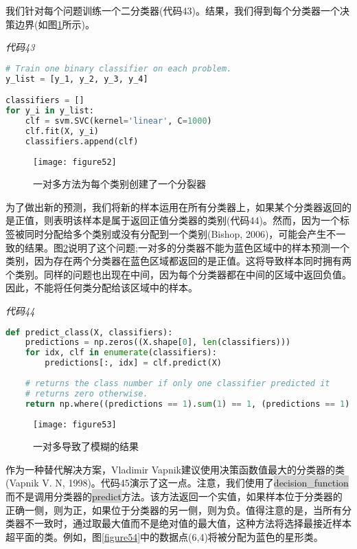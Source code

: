 我们针对每个问题训练一个二分类器(代码43)。结果，我们得到每个分类器一个决策边界(如图\ref{figure52}所示)。

\emph{代码43}

\begin{lstlisting}[language=python]
# Train one binary classifier on each problem. 
y_list = [y_1, y_2, y_3, y_4] 

classifiers = [] 
for y_i in y_list: 
    clf = svm.SVC(kernel='linear', C=1000) 
    clf.fit(X, y_i) 
    classifiers.append(clf)

\end{lstlisting}

\begin{figure}[ht]
	\centering
	\texttt{[image: figure52]}
	\caption{一对多方法为每个类别创建了一个分裂器}
	\label{figure52}
\end{figure}

为了做出新的预测，我们将新的样本运用在所有分类器上，如果某个分类器返回的是正值，则表明该样本是属于返回正值分类器的类别(代码44)。然而，因为一个标签被同时分配给多个类别或没有分配到一个类别(Bishop, 2006)，可能会产生不一致的结果。图\ref{figure53}说明了这个问题;一对多的分类器不能为蓝色区域中的样本预测一个类别，因为存在两个分类器在蓝色区域都返回的是正值。这将导致样本同时拥有两个类别。同样的问题也出现在中间，因为每个分类器都在中间的区域中返回负值。因此，不能将任何类分配给该区域中的样本。

\emph{代码44}

\begin{lstlisting}[language=python]
def predict_class(X, classifiers): 
    predictions = np.zeros((X.shape[0], len(classifiers))) 
    for idx, clf in enumerate(classifiers): 
        predictions[:, idx] = clf.predict(X) 
        
    # returns the class number if only one classifier predicted it 
    # returns zero otherwise. 
    return np.where((predictions == 1).sum(1) == 1, (predictions == 1).argmax(axis=1) + 1, 0)

\end{lstlisting}

\begin{figure}[ht]
	\centering
	\texttt{[image: figure53]}
	\caption{一对多导致了模糊的结果}
	\label{figure53}
\end{figure}

作为一种替代解决方案，Vladimir Vapnik建议使用决策函数值最大的分类器的类(Vapnik V. N, 1998)。代码45演示了这一点。注意，我们使用了\colorbox{lightgray}{decision\_function}而不是调用分类器的\colorbox{lightgray}{predict}方法。该方法返回一个实值，如果样本位于分类器的正确一侧，则为正，如果位于分类器的另一侧，则为负。值得注意的是，当所有分类器不一致时，通过取最大值而不是绝对值的最大值，这种方法将选择最接近样本超平面的类。例如，图\ref{figure54}中的数据点(6,4)将被分配为蓝色的星形类。


